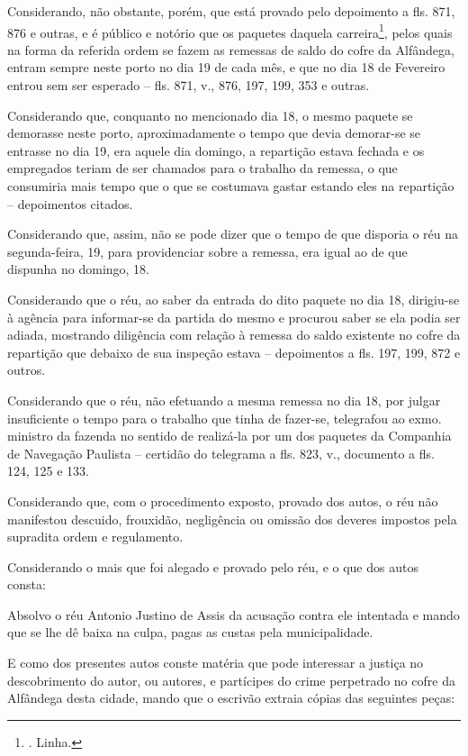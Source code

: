 Considerando, não obstante, porém, que está provado pelo depoimento a
fls. 871, 876 e outras, e é público e notório que os paquetes daquela
carreira\footnote{. Linha.}, pelos quais na forma da referida ordem se
fazem as remessas de saldo do cofre da Alfândega, entram sempre neste
porto no dia 19 de cada mês, e que no dia 18 de Fevereiro entrou sem ser
esperado -- fls. 871, v., 876, 197, 199, 353 e outras.

Considerando que, conquanto no mencionado dia 18, o mesmo paquete se
demorasse neste porto, aproximadamente o tempo que devia demorar-se se
entrasse no dia 19, era aquele dia domingo, a repartição estava fechada
e os empregados teriam de ser chamados para o trabalho da remessa, o que
consumiria mais tempo que o que se costumava gastar estando eles na
repartição -- depoimentos citados.

Considerando que, assim, não se pode dizer que o tempo de que disporia o
réu na segunda-feira, 19, para providenciar sobre a remessa, era igual
ao de que dispunha no domingo, 18.

Considerando que o réu, ao saber da entrada do dito paquete no dia 18,
dirigiu-se à agência para informar-se da partida do mesmo e procurou
saber se ela podia ser adiada, mostrando diligência com relação à
remessa do saldo existente no cofre da repartição que debaixo de sua
inspeção estava -- depoimentos a fls. 197, 199, 872 e outros.

Considerando que o réu, não efetuando a mesma remessa no dia 18, por
julgar insuficiente o tempo para o trabalho que tinha de fazer-se,
telegrafou ao exmo. ministro da fazenda no sentido de realizá-la por um
dos paquetes da Companhia de Navegação Paulista -- certidão do telegrama
a fls. 823, v., documento a fls. 124, 125 e 133.

Considerando que, com o procedimento exposto, provado dos autos, o réu
não manifestou descuido, frouxidão, negligência ou omissão dos deveres
impostos pela supradita ordem e regulamento.

Considerando o mais que foi alegado e provado pelo réu, e o que dos
autos consta:

Absolvo o réu Antonio Justino de Assis da acusação contra ele intentada
e mando que se lhe dê baixa na culpa, pagas as custas pela
municipalidade.

E como dos presentes autos conste matéria que pode interessar a justiça
no descobrimento do autor, ou autores, e partícipes do crime perpetrado
no cofre da Alfândega desta cidade, mando que o escrivão extraia cópias
das seguintes peças:

